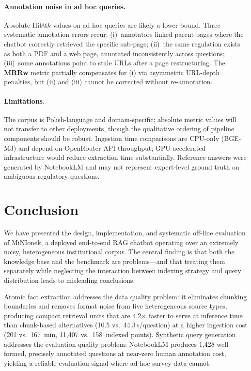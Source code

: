 \documentclass[sigconf,natbib=true]{acmart}
\begin{document}
\paragraph{Annotation noise in ad hoc queries.}
Absolute Hit@$k$ values on ad hoc queries are likely a lower bound.
Three systematic annotation errors recur: (i)~annotators linked parent pages where the chatbot correctly retrieved the specific sub-page; (ii)~the same regulation exists as both a PDF and a web page, annotated inconsistently across questions; (iii)~some annotations point to stale URLs after a page restructuring.
The \textbf{MRRw} metric partially compensates for (i) via asymmetric URL-depth penalties, but (ii) and (iii) cannot be corrected without re-annotation.

\paragraph{Limitations.}
The corpus is Polish-language and domain-specific; absolute metric values will not transfer to other deployments, though the qualitative ordering of pipeline components should be robust.
Ingestion time comparisons are CPU-only (BGE-M3) and depend on OpenRouter API throughput; GPU-accelerated infrastructure would reduce extraction time substantially.
Reference answers were generated by NotebookLM and may not represent expert-level ground truth on ambiguous regulatory questions.

\section{Conclusion}

We have presented the design, implementation, and systematic off-line evaluation of MiNIonek, a deployed end-to-end RAG chatbot operating over an extremely noisy, heterogeneous institutional corpus.
The central finding is that both the knowledge base and the benchmark are problems---and that treating them separately while neglecting the interaction between indexing strategy and query distribution leads to misleading conclusions.

Atomic fact extraction addresses the data quality problem: it eliminates chunking boundaries and removes format noise from five heterogeneous source types, producing compact retrieval units that are 4.2$\times$ faster to serve at inference time than chunk-based alternatives (10.5 vs.\ 44.3\,s/question) at a higher ingestion cost (201 vs.\ 167~min, 11{,}407 vs.\ 158~indexed points).
Synthetic query generation addresses the evaluation quality problem: NotebookLM produces 1{,}428 well-formed, precisely annotated questions at near-zero human annotation cost, yielding a reliable evaluation signal where ad hoc survey data cannot.
\end{document}

